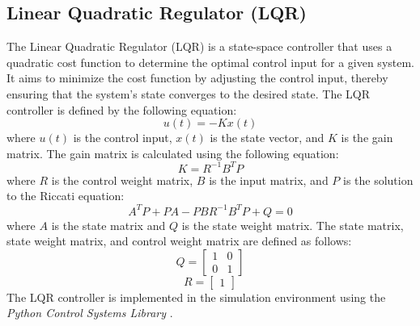 \subsection{Linear Quadratic Regulator (LQR)}
The Linear Quadratic Regulator (LQR) is a state-space controller that uses a quadratic cost function to determine the optimal control input for a given system. It aims to minimize the cost function by adjusting the control input, thereby ensuring that the system's state converges to the desired state. The LQR controller is defined by the following equation:
\begin{equation}
	u(t) = -Kx(t)
\end{equation}
where $u(t)$ is the control input, $x(t)$ is the state vector, and $K$ is the gain matrix. The gain matrix is calculated using the following equation:
\begin{equation}
	K = R^{-1}B^TP
\end{equation}
where $R$ is the control weight matrix, $B$ is the input matrix, and $P$ is the solution to the Riccati equation:
\begin{equation}
	A^TP + PA - PBR^{-1}B^TP + Q = 0
\end{equation}
where $A$ is the state matrix and $Q$ is the state weight matrix. The state matrix, state weight matrix, and control weight matrix are defined as follows:
\begin{equation}
	Q = \begin{bmatrix}
		1 & 0 \\
		0 & 1

	\end{bmatrix}
\end{equation}
\begin{equation}
	R = \begin{bmatrix}
		1
	\end{bmatrix}
\end{equation}
The LQR controller is implemented in the simulation environment using the \textit{Python Control Systems Library} \cite{python_control2021}.

